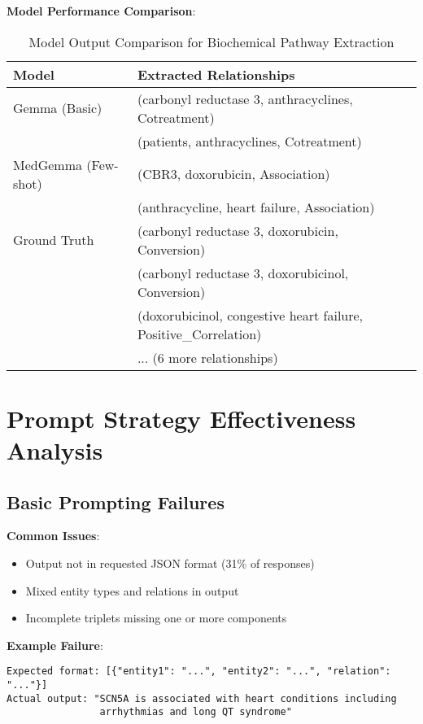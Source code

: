 \textbf{Model Performance Comparison}:

\begin{table}[htbp]
\centering
\caption{Model Output Comparison for Biochemical Pathway Extraction}
\label{tab:pathway-comparison}
\begin{tabular}{lp{8cm}}
\toprule
\textbf{Model} & \textbf{Extracted Relationships} \\
\midrule
Gemma (Basic) & (carbonyl reductase 3, anthracyclines, Cotreatment) \\
              & (patients, anthracyclines, Cotreatment) \\
\midrule
MedGemma (Few-shot) & (CBR3, doxorubicin, Association) \\
                    & (anthracycline, heart failure, Association) \\
\midrule
Ground Truth & (carbonyl reductase 3, doxorubicin, Conversion) \\
             & (carbonyl reductase 3, doxorubicinol, Conversion) \\
             & (doxorubicinol, congestive heart failure, Positive\_Correlation) \\
             & ... (6 more relationships) \\
\bottomrule
\end{tabular}
\end{table}

\section{Prompt Strategy Effectiveness Analysis}

\subsection{Basic Prompting Failures}

\textbf{Common Issues}:
\begin{itemize}
    \item Output not in requested JSON format (31\% of responses)
    \item Mixed entity types and relations in output
    \item Incomplete triplets missing one or more components
\end{itemize}

\textbf{Example Failure}:
\begin{verbatim}
Expected format: [{"entity1": "...", "entity2": "...", "relation": "..."}]
Actual output: "SCN5A is associated with heart conditions including 
                arrhythmias and long QT syndrome"
\end{verbatim}

